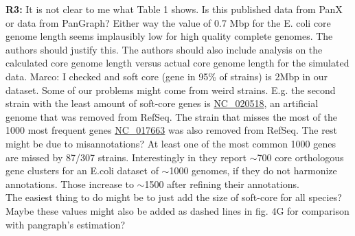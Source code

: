\documentclass[aps,rmp,onecolumn]{revtex4-1}
\newcommand{\Marco}[1]{{\color{gray}Marco: #1}}
\newcommand{\Liam}[1]{{\color{teal}Liam: #1}}
\newcommand{\reviewer}[2]{\textbf{#1:} #2\vskip 5mm}
\begin{document}
\reviewer{R3}{It is not clear to me what Table 1 shows. Is this published data from PanX or data from PanGraph? Either way the value of 0.7 Mbp for the E. coli core genome length seems implausibly low for high quality complete genomes. The authors should justify this. The authors should also include analysis on the calculated core genome length versus actual core genome length for the simulated data.}
\Marco{I checked and soft core (gene in 95\% of strains) is 2Mbp in our dataset. Some of our problems might come from weird strains. E.g. the second strain with the least amount of soft-core genes is \href{https://www.ncbi.nlm.nih.gov/nuccore/NC_020518.1?report=genbank}{NC\_020518}, an artificial genome that was removed from RefSeq. The strain that misses the most of the 1000 most frequent genes \href{https://www.ncbi.nlm.nih.gov/nuccore/NC_017663.1?report=genbank}{NC\_017663} was also removed from RefSeq. The rest might be due to misannotations? At least one of the most common 1000 genes are missed by 87/307 strains. Interestingly in \cite{sutton2021pan} they report $\sim$700 core orthologous gene clusters for an E.coli dataset of $\sim$1000 genomes, if they do not harmonize annotations. Those increase to $\sim$1500 after refining their annotations.\\
      The easiest thing to do might be to just add the size of soft-core for all species? Maybe these values might also be added as dashed lines in fig. 4G for comparison with pangraph's estimation?}\\
\end{document}
